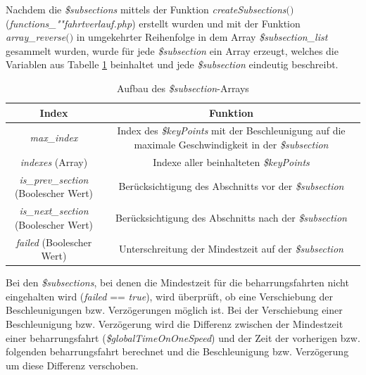 Nachdem die \textit{\$subsections} mittels der Funktion \textit{createSubsections$($$)$} (\textit{func\-tions\_""fahrt\-ver\-lauf.php}) erstellt wurden und mit der Funktion \textit{array\_reverse$($$)$} in umgekehrter Reihenfolge in dem Array \textit{\$subsection\_list} gesammelt wurden, wurde für jede \textit{\$subsection} ein Array erzeugt, welches die Variablen aus Tabelle \ref{table:subsection} beinhaltet und jede \textit{\$subsection} eindeutig beschreibt.
\begin{table}
\begin{center}
\renewcommand{\arraystretch}{1.2}
\begin{tabular}{c|c}
Index & Funktion \\ \hline
\textit{max\_index}                 	&  	\makecell{Index des \textit{\$keyPoints} mit der Beschleunigung auf die\\maximale Geschwindigkeit in der \textit{\$subsection}}     \\ \hline
\textit{indexes} (Array)                 		&    	Indexe aller beinhalteten \textit{\$keyPoints}                  \\ \hline
\makecell{\textit{is\_prev\_section}\\(Boolescher Wert)}           	&   	Berücksichtigung des Abschnitts vor der \textit{\$subsection}     \\ \hline
\makecell{\textit{is\_next\_section}\\(Boolescher Wert)}           	&     	Berücksichtigung des Abschnitts nach der \textit{\$subsection}                 \\ \hline
\textit{failed} (Boolescher Wert)             & Unterschreitung der Mindestzeit auf der \textit{\$subsection}     \\ 
\end{tabular}
\renewcommand{\arraystretch}{1}
\caption{Aufbau des \textit{\$subsection}-Arrays}
\label{table:subsection}
\end{center}
\end{table}

Bei den \textit{\$subsections}, bei denen die Mindestzeit für die \Gls{beharrungsfahrt}en nicht eingehalten wird (\textit{failed} == \textit{true}), wird überprüft, ob eine Verschiebung der Beschleunigungen bzw. Verzögerungen möglich ist. Bei der Verschiebung einer Beschleunigung bzw. Verzögerung wird die Differenz zwischen der Mindestzeit einer \Gls{beharrungsfahrt} (\textit{\$global\-Time\-On\-One\-Speed}) und der Zeit der vorherigen bzw. folgenden \Gls{beharrungsfahrt} berechnet und die Beschleunigung bzw. Verzögerung um diese Differenz verschoben.

